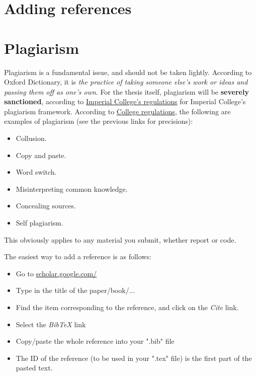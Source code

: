 \documentclass[a4paper, twoside]{report}
\theoremstyle{definition}
\numberwithin{equation}{section}
\begin{document}
\section{Adding references}


\section{Plagiarism}
Plagiarism is a fundamental issue, and should not be taken lightly.
According to Oxford Dictionary, it is
\textit{the practice of taking someone else's work or ideas and passing them off as one's own}.
For the thesis itself, plagiarism will be \textbf{severely sanctioned}, according to
\href{http://www.imperial.ac.uk/student-records-and-data/for-current-students/undergraduate-and-taught-postgraduate/exams-assessments-and-regulations/plagiarism-academic-integrity--exam-offences/}
{Imperial College's regulations}
for Imperial College's plagiarism framework.
According to \href{https://www.imperial.ac.uk/admin-services/library/research-support/plagiarism-awareness-for-researchers/supervising-plagiarism-by-students/}{College regulations},
the following are examples of plagiarism (see the previous links for precisions):
\begin{itemize}
  \item Collusion.
  \item Copy and paste.
  \item Word switch.
  \item Misinterpreting common knowledge.
  \item Concealing sources.
  \item Self plagiarism.
\end{itemize}

This obviously applies to any material you submit, whether report or code.

The easiest way to add a reference is as follows:
\begin{itemize}
  \item Go to \href{https://scholar.google.com/}{scholar.google.com/}
  \item Type in the title of the paper/book/...
  \item Find the item corresponding to the reference, and click on the \emph{Cite} link.
  \item Select the \emph{BibTeX} link
  \item Copy/paste the whole reference into your ".bib" file
  \item The ID of the reference (to be used in your ".tex" file) is the first part of the pasted text.
\end{itemize}
\end{document}
